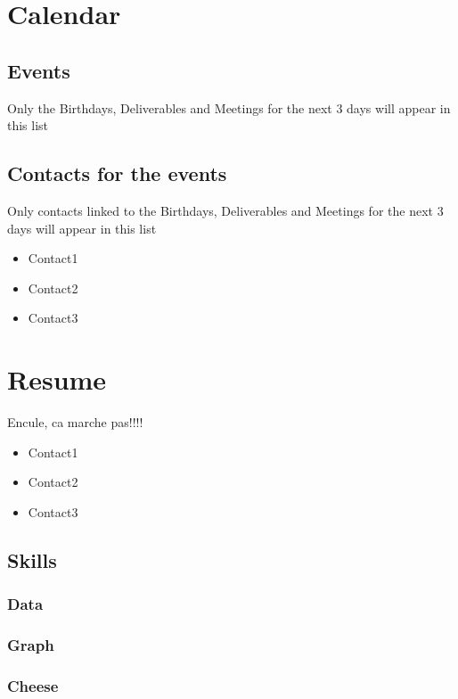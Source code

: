 \documentclass[8pt]{article} %
\begin{document}
\section{Calendar}

\subsection{Events}
{\footnotesize
Only the Birthdays, Deliverables and Meetings for the next 3 days will appear in this list\\
}
{\footnotesize

}

\subsection{Contacts for the events}
{\footnotesize
Only contacts linked to the Birthdays, Deliverables and Meetings for the next 3 days will appear in this list\\

}
\begin{itemize}
  \item Contact1 
  \item Contact2 
  \item Contact3 
\end{itemize}

\section{Resume}
%
Encule, ca marche pas!!!!
\begin{itemize}
  \item Contact1 
  \item Contact2 
  \item Contact3 
\end{itemize}

\subsection{Skills}

{\footnotesize
\subsubsection{Data}

\subsubsection{Graph}

\subsubsection{Cheese}

}
\end{document}
